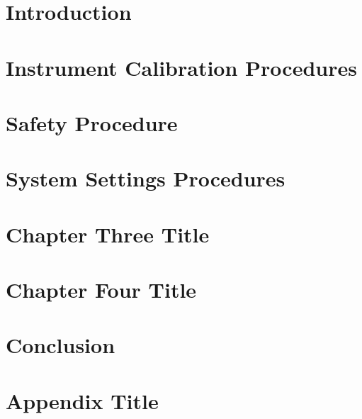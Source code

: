 \documentclass[12pt]{report}
\begin{document}
 \tableofcontents
 \chapter{Introduction}
 
  \chapter{Instrument Calibration Procedures}
 
 
  \chapter{Safety Procedure}
 
 
 \chapter{System Settings Procedures}
 
 
 \chapter{Chapter Three Title}
 
 
 \chapter{Chapter Four Title}
 
 
 \chapter{Conclusion}
 
 \appendix
 \chapter{Appendix Title}
 
 
 

 
\end{document}
